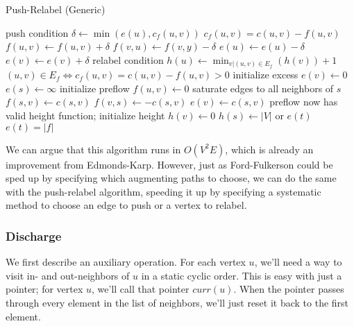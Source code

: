 \begin{algorithm}[H]
\caption{Push-Relabel (Generic)}
\begin{algorithmic}
		\Comment push condition
		\State $\delta \gets \min(e(u), c_f(u,v))$
		\Comment $c_f(u,v) = c(u,v) - f(u,v)$
		\State $f(u,v) \gets f(u,v) + \delta$
		\State $f(v,u) \gets f(v,y) - \delta$
		\State $e(u) \gets e(u) - \delta$
		\State $e(v) \gets e(v) + \delta$
	\EndIf
\EndFunction
{}
		\Comment relabel condition
		\State $h(u) \gets \min_{v | (u,v) \in E_f}(h(v)) + 1$
		\Comment $(u,v) \in E_f \iff c_f(u,v) = c(u,v) - f(u,v) > 0$
	\EndIf
\EndFunction
{}
		\Comment initialize excess
		\State $e(v) \gets 0$
	\EndFor
	\State $e(s) \gets \infty$
		\Comment initialize preflow
		\State $f(u,v) \gets 0$
	\EndFor
		\Comment saturate edges to all neighbors of $s$
		\State $f(s,v) \gets c(s,v)$
		\State $f(v,s) \gets -c(s,v)$
		\State $e(v) \gets c(s,v)$
	\EndFor
		\Comment preflow now has valid height function; initialize height
		\State $h(v) \gets 0$
	\EndFor
	\State $h(s) \gets |V|$
		\State {} or 
	\EndWhile
	\State \Return $e(t)$
	\Comment $e(t)=|f|$
\EndFunction
\end{algorithmic}
\end{algorithm}

We can argue that this algorithm runs in $O(V^2E)$, which is already an improvement from Edmonds-Karp. However, just as Ford-Fulkerson could be sped up by specifying which augmenting paths to choose, we can do the same with the push-relabel algorithm, speeding it up by specifying a systematic method to choose an edge to push or a vertex to relabel.

\subsubsection{Discharge}

We first describe an auxiliary operation. For each vertex $u$, we'll need a way to visit in- and out-neighbors of $u$ in a static cyclic order. This is easy with just a pointer; for vertex $u$, we'll call that pointer $curr(u)$. When the pointer passes through every element in the list of neighbors, we'll just reset it back to the first element.


